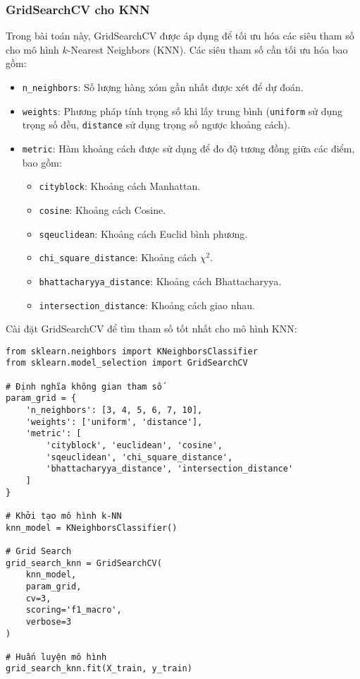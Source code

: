 \documentclass[a4paper,12pt]{article}
\begin{document}
\subsubsection{GridSearchCV cho KNN}  
\hspace{5mm}Trong bài toán này, GridSearchCV được áp dụng để tối ưu hóa các siêu tham số cho mô hình \(k\)-Nearest Neighbors (KNN). Các siêu tham số cần tối ưu hóa bao gồm:  
\begin{itemize}
    \item \texttt{n\_neighbors}: Số lượng hàng xóm gần nhất được xét để dự đoán.
    \item \texttt{weights}: Phương pháp tính trọng số khi lấy trung bình (\texttt{uniform} sử dụng trọng số đều, \texttt{distance} sử dụng trọng số ngược khoảng cách).
    \item \texttt{metric}: Hàm khoảng cách được sử dụng để đo độ tương đồng giữa các điểm, bao gồm:
    \begin{itemize}
        \item \texttt{cityblock}: Khoảng cách Manhattan.
        \item \texttt{cosine}: Khoảng cách Cosine.
        \item \texttt{sqeuclidean}: Khoảng cách Euclid bình phương.
        \item \texttt{chi\_square\_distance}: Khoảng cách \(\chi^2\).
        \item \texttt{bhattacharyya\_distance}: Khoảng cách Bhattacharyya.
        \item \texttt{intersection\_distance}: Khoảng cách giao nhau.
    \end{itemize}
\end{itemize}

Cài đặt GridSearchCV để tìm tham số tốt nhất cho mô hình KNN:

\begin{verbatim}
from sklearn.neighbors import KNeighborsClassifier
from sklearn.model_selection import GridSearchCV

# Định nghĩa không gian tham số
param_grid = {
    'n_neighbors': [3, 4, 5, 6, 7, 10],
    'weights': ['uniform', 'distance'],
    'metric': [
        'cityblock', 'euclidean', 'cosine',
        'sqeuclidean', 'chi_square_distance',
        'bhattacharyya_distance', 'intersection_distance'
    ]
}

# Khởi tạo mô hình k-NN
knn_model = KNeighborsClassifier()

# Grid Search
grid_search_knn = GridSearchCV(
    knn_model,
    param_grid,
    cv=3,
    scoring='f1_macro',
    verbose=3 
)

# Huấn luyện mô hình
grid_search_knn.fit(X_train, y_train)
\end{verbatim}
\end{document}
